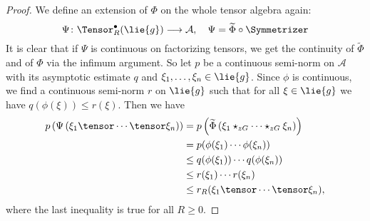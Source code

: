 \begin{proof}
    We define an extension of $\Phi$ on the whole tensor algebra
    again:
    \begin{equation*}
        \Psi \colon
        \Tensor_R^{\bullet}(\lie{g})
        \longrightarrow
        \mathcal{A},
        \quad
        \Psi
        =
        \widetilde{\Phi} \circ \Symmetrizer
    \end{equation*}
    It is clear that if $\Psi$ is continuous on factorizing tensors,
    we get the continuity of $\widetilde{\Phi}$ and of $\Phi$ via the
    infimum argument. So let $p$ be a continuous semi-norm on
    $\mathcal{A}$ with its asymptotic estimate $q$ and $\xi_1, \ldots,
    \xi_n \in \lie{g}$. Since $\phi$ is continuous, we find a
    continuous semi-norm $r$ on $\lie{g}$ such that for all $\xi \in
    \lie{g}$ we have $q(\phi(\xi)) \leq r(\xi)$. Then we have
    \begin{align*}
        p \left(
        \Psi \left(
        \xi_1 \tensor \cdots \tensor \xi_n
        \right) \right)
        & =
        p \left(
        \widetilde{\Phi} \left(
        \xi_1 \star_{zG} \cdots \star_{zG} \xi_n
        \right) \right)
        \\
        & =
        p( \phi(\xi_1) \cdots \phi(\xi_n) )
        \\
        & \leq
        q( \phi(\xi_1) )
        \cdots
        q( \phi(\xi_n) )
        \\
        & \leq
        r(\xi_1) \cdots r(\xi_n)
        \\
        & \leq
        r_R(\xi_1 \tensor \cdots \tensor \xi_n),
    \end{align*}
    where the last inequality is true for all $R \geq 0$.
\end{proof}


